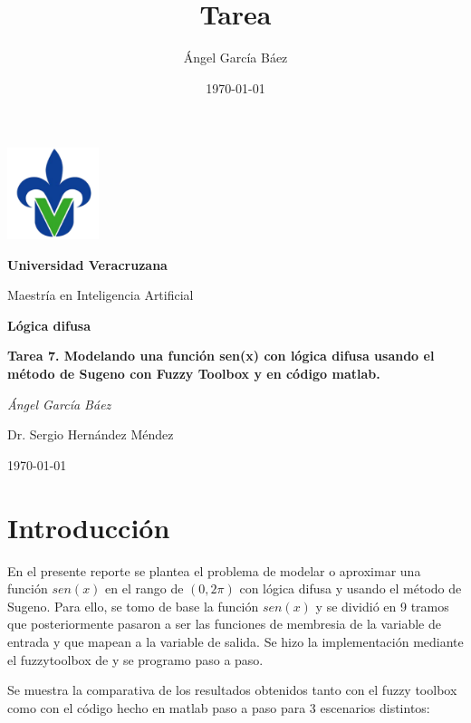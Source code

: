 \documentclass[11pt, letterpaper]{article}
\title{\bfseries Tarea}
\author{Ángel García Báez}
\date{\today}
\begin{document}
	
	\begin{titlepage}
		\centering
		\includegraphics[width=0.2\textwidth]{logo.png}\par
		\vspace{1cm}
		{\LARGE \bfseries Universidad Veracruzana \par}
		\vspace{1cm}
		{\Large Maestría en Inteligencia Artificial\par}
		\vspace{3cm}
		{\LARGE \bfseries Lógica difusa \par}
		\vspace{1cm}
		{\Large \bfseries Tarea 7. Modelando una función sen(x) con lógica difusa usando el método de Sugeno con Fuzzy Toolbox y en código matlab. \par}
		\vfill
		{\Large \textit{Ángel García Báez}\par}
		\vfill
		{\Large Dr. Sergio Hernández Méndez \par}
		\vfill
		{\Large \today \par}
	\end{titlepage}
	
	\newpage
	\tableofcontents
	\newpage
	

\section{Introducción}

En el presente reporte se plantea el problema de modelar o aproximar una función $sen(x)$ en el rango de $(0,2\pi)$ con lógica difusa y usando el método de Sugeno. Para ello, se tomo de base la función $sen(x)$ y se dividió en 9 tramos que posteriormente pasaron a ser las funciones de membresia de la variable de entrada y que mapean a la variable de salida.
Se hizo la implementación mediante el fuzzytoolbox de y se programo paso a paso.

Se muestra la comparativa de los resultados obtenidos tanto con el fuzzy toolbox como con el código hecho en matlab paso a paso para 3 escenarios distintos:
\end{document}
